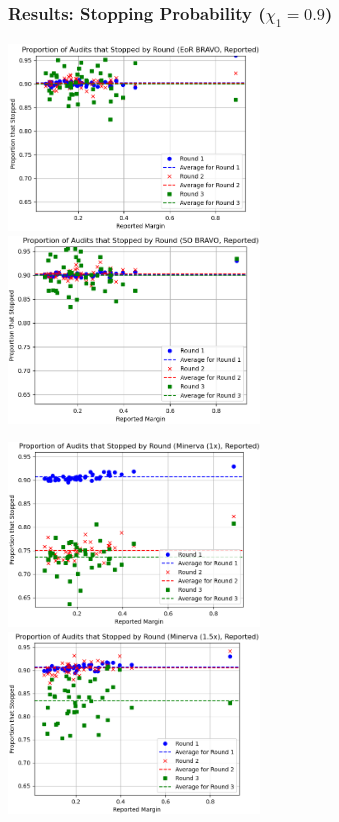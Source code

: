 \documentclass{beamer}
\begin{document}
\begin{frame}
\frametitle{Results: Stopping Probability ($\chi_1=0.9$)}
\pause 

\vspace{.1cm}
\hspace{-.25cm}
\includegraphics[width=0.5\textwidth]{scale/eor.png}
\pause 
\includegraphics[width=0.5\textwidth]{scale/so.png}

\pause 

\vspace{.1cm}
\hspace{-.25cm}
\includegraphics[width=0.5\textwidth]{scale/minerva1.png}
\pause 
\includegraphics[width=0.5\textwidth]{scale/minerva1p5.png}
\end{frame}
\end{document}
